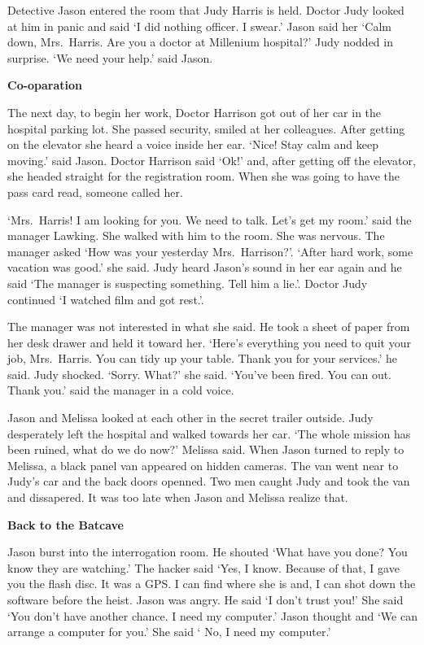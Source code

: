 \documentclass[]{book}
\begin{document}
Detective Jason entered the room that Judy Harris is held. Doctor Judy looked at him in panic and said `I did nothing officer. I swear.' Jason said her `Calm down, Mrs.~Harris. Are you a doctor at Millenium hospital?' Judy nodded in surprise. `We need your help.' said Jason.

\textbf{Co-oparation}

The next day, to begin her work, Doctor Harrison got out of her car in the hospital parking lot. She passed security, smiled at her colleagues. After getting on the elevator she heard a voice inside her ear. `Nice! Stay calm and keep moving.' said Jason. Doctor Harrison said `Ok!' and, after getting off the elevator, she headed straight for the registration room. When she was going to have the pass card read, someone called her.

`Mrs.~Harris! I am looking for you. We need to talk. Let's get my room.' said the manager Lawking. She walked with him to the room. She was nervous. The manager asked `How was your yesterday Mrs.~Harrison?'. `After hard work, some vacation was good.' she said. Judy heard Jason's sound in her ear again and he said `The manager is suspecting something. Tell him a lie.'. Doctor Judy continued `I watched film and got rest.'.

The manager was not interested in what she said. He took a sheet of paper from her desk drawer and held it toward her. `Here's everything you need to quit your job, Mrs.~Harris. You can tidy up your table. Thank you for your services.' he said. Judy shocked. `Sorry. What?' she said. `You've been fired. You can out. Thank you.' said the manager in a cold voice.

Jason and Melissa looked at each other in the secret trailer outside. Judy desperately left the hospital and walked towards her car. `The whole mission has been ruined, what do we do now?' Melissa said. When Jason turned to reply to Melissa, a black panel van appeared on hidden cameras. The van went near to Judy's car and the back doors openned. Two men caught Judy and took the van and dissapered. It was too late when Jason and Melissa realize that.

\textbf{Back to the Batcave}

Jason burst into the interrogation room. He shouted `What have you done? You know they are watching.' The hacker said `Yes, I know. Because of that, I gave you the flash disc. It was a GPS. I can find where she is and, I can shot down the software before the heist. Jason was angry. He said `I don't trust you!' She said `You don't have another chance. I need my computer.' Jason thought and `We can arrange a computer for you.' She said ` No, I need my computer.'
\end{document}

